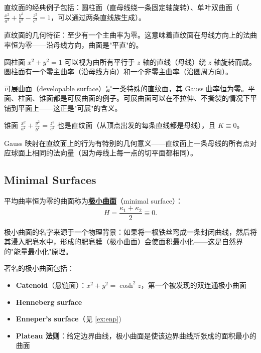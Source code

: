 直纹面的经典例子包括：圆柱面（直母线绕一条固定轴旋转）、单叶双曲面（$\frac{x^2}{a^2} + \frac{y^2}{b^2} - \frac{z^2}{c^2} = 1$，可以通过两条直线族生成）。

直纹面的几何特征：至少有一个主曲率为零。这意味着直纹面在母线方向上的法曲率恒为零——沿母线方向，曲面是"平直"的。

\begin{Example}[圆柱面]\label{ex:cylinder-ruled}
圆柱面 $x^2 + y^2 = 1$ 可以视为由所有平行于 $z$ 轴的直线（母线）绕 $z$ 轴旋转而成。圆柱面有一个零主曲率（沿母线方向）和一个非零主曲率（沿圆周方向）。
\end{Example}

可展曲面（developable surface）是一类特殊的直纹面，其 Gauss 曲率恒为零。平面、柱面、锥面都是可展曲面的例子。可展曲面可以在不拉伸、不撕裂的情况下平铺到平面上——这正是"可展"的含义。

\begin{Example}[锥面]\label{ex:cone-ruled}
锥面 $\frac{x^2}{a^2} + \frac{y^2}{b^2} = \frac{z^2}{c^2}$ 也是直纹面（从顶点出发的每条直线都是母线），且 $K \equiv 0$。
\end{Example}

Gauss 映射在直纹面上的行为有特别的几何意义——直纹面上一条母线的所有点对应球面上相同的法向量（因为母线上每一点的切平面都相同）。

\subsection{Minimal Surfaces}\label{sec:minimal-surfaces}

\begin{Definition}\label{def:minimal-surface}
平均曲率恒为零的曲面称为\textbf{\underline{极小曲面}}（minimal surface）：
\[
H = \frac{\kappa_1 + \kappa_2}{2} \equiv 0.
\tag{3-5-1}
\]
\end{Definition}

极小曲面的名字来源于一个物理背景：如果将一根铁丝弯成一条封闭曲线，然后将其浸入肥皂水中，形成的肥皂膜（极小曲面）会使面积最小化——这是自然界的"能量最小化"原理。

著名的极小曲面包括：
\begin{itemize}
    \item \textbf{Catenoid}（悬链面）：$x^2 + y^2 = \cosh^2 z$，第一个被发现的双连通极小曲面
    \item \textbf{Henneberg surface}
    \item \textbf{Enneper's surface}（见 \cref{ex:enp})
    \item \textbf{Plateau 法则}：给定边界曲线，极小曲面是使该边界曲线所张成的面积最小的曲面
\end{itemize}

